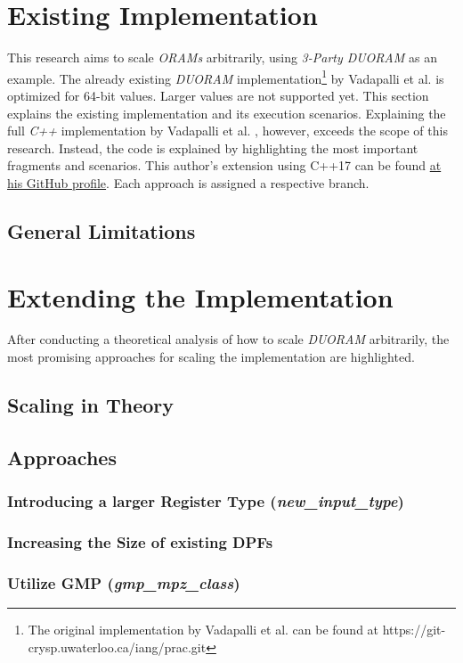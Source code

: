 \chapter{Existing Implementation}\label{ch:Implementation}

\label{sec:ImplementationTarget}
This research aims to scale \textit{ORAMs} arbitrarily, using \textit{3-Party DUORAM} as an example.
The already existing \textit{DUORAM} implementation\footnote{The original implementation by Vadapalli et al. can be found at https://git-crysp.uwaterloo.ca/iang/prac.git} by Vadapalli et al. \cite{vadapalli2023duoram} is optimized for 64-bit values.
Larger values are not supported yet.
This section explains the existing implementation and its execution scenarios.
Explaining the full \textit{C++} implementation by Vadapalli et al. \cite{vadapalli2023duoram}, however, exceeds the scope of this research.
Instead, the code is explained by highlighting the most important fragments and scenarios.
This author's extension using C++17 can be found \hyperlink{https://github.com/FelixWeik/PrivateRandomAccessComputations}{at his GitHub profile}.
Each approach is assigned a respective branch.



\section{General Limitations}


\chapter{Extending the Implementation}\label{ch:ExtendingTheImplementation}
After conducting a theoretical analysis of how to scale \textit{DUORAM} arbitrarily, the most promising approaches for scaling the implementation are highlighted.

\section{Scaling in Theory}\label{sec:ScalingInTheory}


\section{Approaches}\label{sec:approaches}
\subsection{Introducing a larger Register Type (\textit{new\_input\_type})}


\subsection{Increasing the Size of existing DPFs}


\subsection{Utilize GMP (\textit{gmp\_mpz\_class})} 
